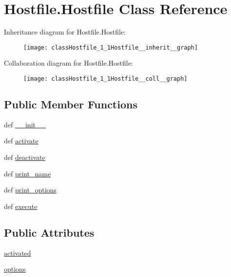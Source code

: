 \hypertarget{classHostfile_1_1Hostfile}{\section{Hostfile.\-Hostfile Class Reference}
\label{classHostfile_1_1Hostfile}
}


Inheritance diagram for Hostfile.\-Hostfile\-:\nopagebreak
\begin{figure}[H]
\begin{center}
\leavevmode
\texttt{[image: classHostfile\_1\_1Hostfile\_\_inherit\_\_graph]}
\end{center}
\end{figure}


Collaboration diagram for Hostfile.\-Hostfile\-:\nopagebreak
\begin{figure}[H]
\begin{center}
\leavevmode
\texttt{[image: classHostfile\_1\_1Hostfile\_\_coll\_\_graph]}
\end{center}
\end{figure}
\subsection*{Public Member Functions}
\begin{DoxyCompactItemize}
\item 
def \hyperlink{classHostfile_1_1Hostfile_a52aed50a2bf4f33e4e5cfad2cbd581b1}{\-\_\-\-\_\-init\-\_\-\-\_\-}
\item 
def \hyperlink{classHostfile_1_1Hostfile_a8616a84e18671ab20244a3c4044a5756}{activate}
\item 
def \hyperlink{classHostfile_1_1Hostfile_afe1c03869ebc36a4ef3c441e975b6d10}{deactivate}
\item 
def \hyperlink{classHostfile_1_1Hostfile_a99d81f6c66b81f002940f92964694dcb}{print\-\_\-name}
\item 
def \hyperlink{classHostfile_1_1Hostfile_ac71717cb565e64532d0faa1f96724803}{print\-\_\-options}
\item 
def \hyperlink{classHostfile_1_1Hostfile_a08284cdaded1e9f114fd550f87d577f1}{execute}
\end{DoxyCompactItemize}
\subsection*{Public Attributes}
\begin{DoxyCompactItemize}
\item 
\hyperlink{classHostfile_1_1Hostfile_a052ee59f7fc26fbda14717ab3291b283}{activated}
\item 
\hyperlink{classHostfile_1_1Hostfile_a3b460597c8d5a628c265573aa532a568}{options}
\end{DoxyCompactItemize}


